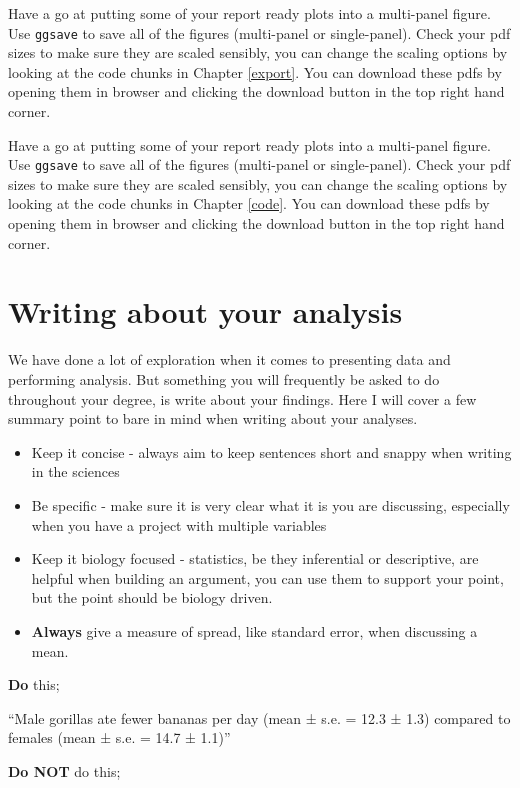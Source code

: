 \documentclass[
]{book}
\providecommand{\tightlist}{%
  \setlength{\itemsep}{0pt}\setlength{\parskip}{0pt}}
\begin{document}
Have a go at putting some of your report ready plots into a multi-panel figure. Use \texttt{ggsave} to save all of the figures (multi-panel or single-panel). Check your pdf sizes to make sure they are scaled sensibly, you can change the scaling options by looking at the code chunks in Chapter \ref{export}. You can download these pdfs by opening them in browser and clicking the download button in the top right hand corner.

Have a go at putting some of your report ready plots into a multi-panel figure. Use \texttt{ggsave} to save all of the figures (multi-panel or single-panel). Check your pdf sizes to make sure they are scaled sensibly, you can change the scaling options by looking at the code chunks in Chapter \ref{code}. You can download these pdfs by opening them in browser and clicking the download button in the top right hand corner.

\section{Writing about your analysis}\label{analysis-writing}

We have done a lot of exploration when it comes to presenting data and performing analysis. But something you will frequently be asked to do throughout your degree, is write about your findings. Here I will cover a few summary point to bare in mind when writing about your analyses.

\begin{itemize}
\tightlist
\item
  Keep it concise - always aim to keep sentences short and snappy when writing in the sciences
\item
  Be specific - make sure it is very clear what it is you are discussing, especially when you have a project with multiple variables
\item
  Keep it biology focused - statistics, be they inferential or descriptive, are helpful when building an argument, you can use them to support your point, but the point should be biology driven.
\item
  \textbf{Always} give a measure of spread, like standard error, when discussing a mean.
\end{itemize}

\textbf{Do} this;

``Male gorillas ate fewer bananas per day (mean ± s.e. = 12.3 ± 1.3) compared to females (mean ± s.e. = 14.7 ± 1.1)''

\textbf{Do NOT} do this;
\end{document}
